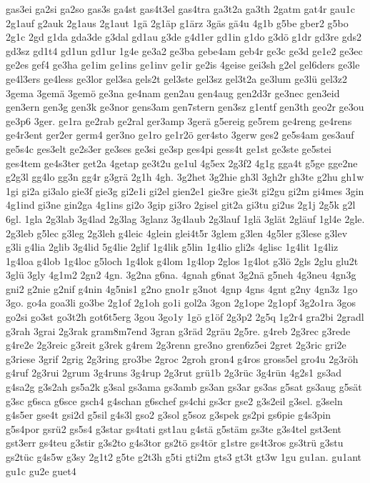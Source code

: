 {gas3ei
ga2si
ga2so
gas3s
ga4st
gas4t3el
gas4tra
ga3t2a
ga3th
2gatm
gat4r
gau1c
2g1auf
g2auk
2g1aus
2g1aut
1gä
2g1äp
g1ärz
3gäs
gä4u
4g1b
g5be
gber2
g5bo
2g1c
2gd
g1da
gda3de
g3dal
gd1au
g3de
g4d1er
gd1in
g1do
g3dö
g1dr
gd3re
gds2
gd3sz
gd1t4
gd1un
gd1ur
1g4e
ge3a2
ge3ba
gebe4am
geb4r
ge3c
ge3d
ge1e2
ge3ec
ge2es
gef4
ge3ha
ge1im
ge1ins
ge1inv
ge1ir
ge2is
4geise
gei3sh
g2el
gel6ders
ge3le
ge4l3ers
ge4less
ge3lor
gel3sa
gels2t
gel3ste
gel3sz
gel3t2a
ge3lum
ge3lü
gel3z2
3gema
3gemä
3gemö
ge3na
ge4nam
gen2au
gen4aug
gen2d3r
ge3nec
gen3eid
gen3ern
gen3g
gen3k
ge3nor
gens3am
gen7stern
gen3sz
g1entf
gen3th
geo2r
ge3ou
ge3p6
3ger.
ge1ra
ge2rab
ge2ral
ger3amp
3gerä
g5ereig
ge5rem
ge4reng
ge4rens
ge4r3ent
ger2er
germ4
ger3no
ge1ro
ge1r2ö
ger4sto
3gerw
ges2
ge5s4am
ges3auf
ge5s4c
ges3elt
ge2s3er
ge3ses
ge3si
ge3sp
ges4pi
gess4t
ge1st
ge3ste
ge5stei
ges4tem
ge4s3ter
get2a
4getap
ge3t2u
ge1ul
4g5ex
2g3f2
4g1g
gga4t
g5ge
gge2ne
g2g3l
gg4lo
gg3n
gg4r
g3grä
2g1h
4gh.
3g2het
3g2hie
gh3l
3gh2r
gh3te
g2hu
gh1w
1gi
gi2a
gi3alo
gie3f
gie3g
gi2e1i
gi2el
gien2e1
gie3re
gie3t
gi2gu
gi2m
gi4mes
3gin
4g1ind
gi3ne
gin2ga
4g1ins
gi2o
3gip
gi3ro
2gisel
git2a
gi3tu
gi2us
2g1j
2g5k
g2l
6gl.
1gla
2g3lab
3g4lad
2g3lag
3glanz
3g4laub
2g3lauf
1glä
3glät
2gläuf
1gl4e
2gle.
2g3leb
g5lec
g3leg
2g3leh
g4leic
4glein
glei4t5r
3glem
g3len
4g5ler
g3lese
g3lev
g3li
g4lia
2glib
3g4lid
5g4lie
2glif
1g4lik
g5lin
1g4lio
gli2s
4glisc
1g4lit
1g4liz
1g4loa
g4lob
1g4loc
g5loch
1g4lok
g4lom
1g4lop
2glos
1g4lot
g3lö
2gls
2glu
glu2t
3glü
3gly
4g1m2
2gn2
4gn.
3g2na
g6na.
4gnah
g6nat
3g2nä
g5neh
4g3neu
4gn3g
gni2
g2nie
g2nif
g4nin
4g5nis1
g2no
gno1r
g3not
4gnp
4gns
4gnt
g2ny
4gn3z
1go
3go.
go4a
goa3li
go3be
2g1of
2g1oh
go1i
gol2a
3gon
2g1ope
2g1opf
3g2o1ra
3gos
go2si
go3st
go3t2h
got6t5erg
3gou
3go1y
1gö
g1öf
2g3p2
2g5q
1g2r4
gra2bi
2gradl
g3rah
3grai
2g3rak
gram8m7end
3gran
g3räd
2gräu
2g5re.
g4reb
2g3rec
g3rede
g4re2e
2g3reic
g3reit
g3rek
g4rem
2g3renn
gre3no
gren6z5ei
2gret
2g3ric
gri2e
g3riese
3grif
2grig
2g3ring
gro3be
2groc
2groh
gron4
g4ros
gross5el
gro4u
2g3röh
g4ruf
2g3rui
2grum
3g4runs
3g4rup
2g3rut
grü1b
2g3rüc
3g4rün
4g2s1
gs3ad
g4sa2g
g3s2ah
gs5a2k
g3sal
gs3ama
gs3amb
gs3an
gs3ar
gs3as
g5sat
gs3aug
g5sät
g3sc
g6sca
g6sce
gsch4
g4schan
g6schef
gs4chi
gs3cr
gse2
g3s2eil
g3sel.
g3seln
g4s5er
gse4t
gsi2d
g5sil
g4s3l
gso2
g3sol
g5soz
g3spek
gs2pi
gs6pie
g4s3pin
g5s4por
gsrü2
gs5s4
g3star
gs4tati
gst1au
g4stä
g5stäm
gs3te
g3s4tel
gst3ent
gst3err
gs4teu
g3stir
g3s2to
g4s3tor
gs2tö
gs4tör
g1stre
gs4t3ros
gs3trü
g3stu
gs2tüc
g4s5w
g3sy
2g1t2
g5te
g2t3h
g5ti
gti2m
gts3
gt3t
gt3w
1gu
gu1an.
gu1ant
gu1c
gu2e
guet4
}
